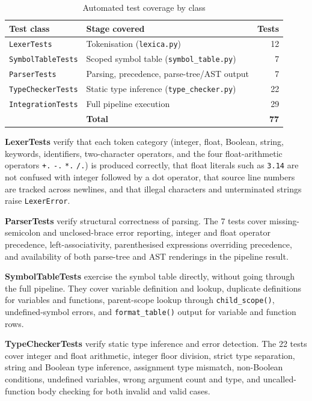 \begin{table}[H]
\centering
\caption{Automated test coverage by class}
\label{tab:test-summary}
\begin{tabular}{llr}
\toprule
Test class & Stage covered & Tests \\
\midrule
\texttt{LexerTests}        & Tokenisation (\texttt{lexica.py})                &  12 \\
\texttt{SymbolTableTests}  & Scoped symbol table (\texttt{symbol\_table.py})  &   7 \\
\texttt{ParserTests}       & Parsing, precedence, parse-tree/AST output        &   7 \\
\texttt{TypeCheckerTests}  & Static type inference (\texttt{type\_checker.py}) &  22 \\
\texttt{IntegrationTests}  & Full pipeline execution                           &  29 \\
\midrule
                           & \textbf{Total}                                   & \textbf{77} \\
\bottomrule
\end{tabular}
\end{table}

\noindent\textbf{LexerTests} verify that each token category (integer, float,
Boolean, string, keywords, identifiers, two-character operators, and the four
float-arithmetic operators \texttt{+.} \texttt{-.} \texttt{*.} \texttt{/.})
is produced correctly, that float literals such as \texttt{3.14} are not
confused with integer followed by a dot operator, that source line numbers are
tracked across newlines, and that illegal characters and unterminated strings
raise \texttt{LexerError}.

\noindent\textbf{ParserTests} verify structural correctness of parsing. The 7
tests cover missing-semicolon and unclosed-brace error reporting, integer and
float operator precedence, left-associativity, parenthesised expressions
overriding precedence, and availability of both parse-tree and AST renderings
in the pipeline result.

\noindent\textbf{SymbolTableTests} exercise the symbol table directly, without
going through the full pipeline. They cover variable definition and lookup,
duplicate definitions for variables and functions, parent-scope lookup through
\texttt{child\_scope()}, undefined-symbol errors, and \texttt{format\_table()}
output for variable and function rows.

\noindent\textbf{TypeCheckerTests} verify static type inference and error
detection. The 22 tests cover integer and float arithmetic, integer floor
division, strict type separation, string and Boolean type inference, assignment
type mismatch, non-Boolean conditions, undefined variables, wrong argument
count and type, and uncalled-function body checking for both invalid and valid
cases.

